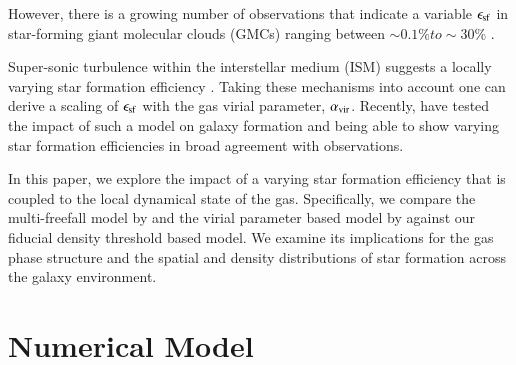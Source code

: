 \documentclass{aa}
\begin{document}
However, there is a growing number of observations that indicate a variable $\epsilon_{\rm sf}$ in star-forming giant molecular clouds (GMCs) ranging between $\sim0.1\% to \sim30\%$ \citep{Heiderman_2010,Lada2010,Murray2011,Evans2014,Evans_2022,Utomo2018,Lee2016}.

Super-sonic turbulence within the interstellar medium (ISM) suggests a locally varying star formation efficiency \citep[e.g.][]{Krumholz2005,Padoan2011,Padoan_2012,Federrath2012,Evans_2022}.
Taking these mechanisms into account one can derive a scaling of $\epsilon_{\rm sf}$ with the gas virial parameter, $\alpha_{\rm vir}$. Recently, \cite{Semenov_2016} have tested the impact of such a model on galaxy formation and being able to show varying star formation efficiencies in broad agreement with observations.  

In this paper, we explore the impact of a varying star formation efficiency that is coupled to the local dynamical state of the gas. Specifically, we compare the multi-freefall model by \cite{Federrath2012} and the virial parameter based model by \cite{Padoan_2012} against our fiducial density threshold based model. We examine its implications for the gas phase structure and the spatial and density distributions of star formation across the galaxy environment.

\section{Numerical Model}
\label{sec:sims}
\end{document}
